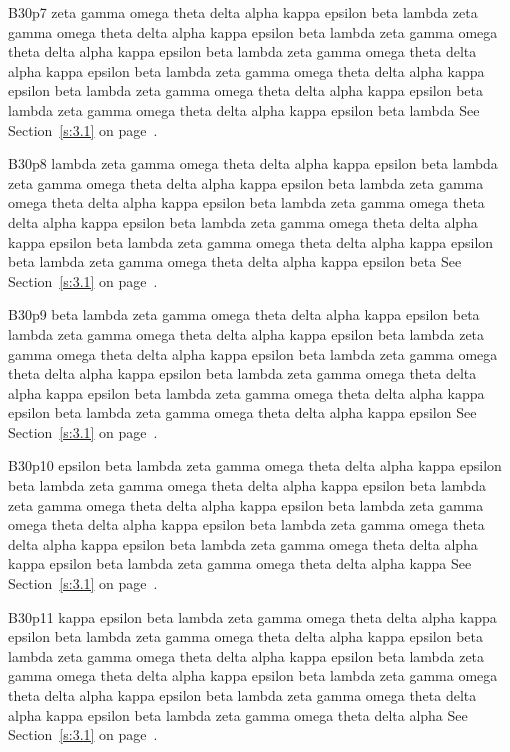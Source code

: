 B30p7 zeta gamma omega theta delta alpha kappa epsilon beta lambda zeta gamma omega theta delta alpha kappa epsilon beta lambda zeta gamma omega theta delta alpha kappa epsilon beta lambda zeta gamma omega theta delta alpha kappa epsilon beta lambda zeta gamma omega theta delta alpha kappa epsilon beta lambda zeta gamma omega theta delta alpha kappa epsilon beta lambda zeta gamma omega theta delta alpha kappa epsilon beta lambda See Section~\ref{s:3.1} on page~\pageref{s:3.1}.

B30p8 lambda zeta gamma omega theta delta alpha kappa epsilon beta lambda zeta gamma omega theta delta alpha kappa epsilon beta lambda zeta gamma omega theta delta alpha kappa epsilon beta lambda zeta gamma omega theta delta alpha kappa epsilon beta lambda zeta gamma omega theta delta alpha kappa epsilon beta lambda zeta gamma omega theta delta alpha kappa epsilon beta lambda zeta gamma omega theta delta alpha kappa epsilon beta See Section~\ref{s:3.1} on page~\pageref{s:3.1}.

B30p9 beta lambda zeta gamma omega theta delta alpha kappa epsilon beta lambda zeta gamma omega theta delta alpha kappa epsilon beta lambda zeta gamma omega theta delta alpha kappa epsilon beta lambda zeta gamma omega theta delta alpha kappa epsilon beta lambda zeta gamma omega theta delta alpha kappa epsilon beta lambda zeta gamma omega theta delta alpha kappa epsilon beta lambda zeta gamma omega theta delta alpha kappa epsilon See Section~\ref{s:3.1} on page~\pageref{s:3.1}.

B30p10 epsilon beta lambda zeta gamma omega theta delta alpha kappa epsilon beta lambda zeta gamma omega theta delta alpha kappa epsilon beta lambda zeta gamma omega theta delta alpha kappa epsilon beta lambda zeta gamma omega theta delta alpha kappa epsilon beta lambda zeta gamma omega theta delta alpha kappa epsilon beta lambda zeta gamma omega theta delta alpha kappa epsilon beta lambda zeta gamma omega theta delta alpha kappa See Section~\ref{s:3.1} on page~\pageref{s:3.1}.

B30p11 kappa epsilon beta lambda zeta gamma omega theta delta alpha kappa epsilon beta lambda zeta gamma omega theta delta alpha kappa epsilon beta lambda zeta gamma omega theta delta alpha kappa epsilon beta lambda zeta gamma omega theta delta alpha kappa epsilon beta lambda zeta gamma omega theta delta alpha kappa epsilon beta lambda zeta gamma omega theta delta alpha kappa epsilon beta lambda zeta gamma omega theta delta alpha See Section~\ref{s:3.1} on page~\pageref{s:3.1}.

